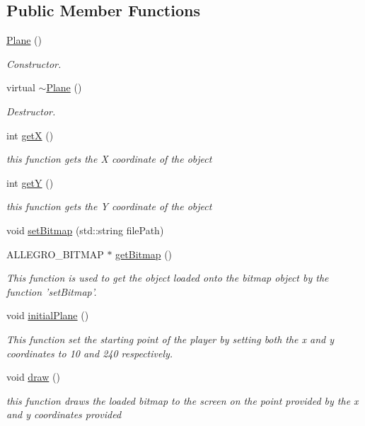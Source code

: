 \subsection*{Public Member Functions}
\begin{DoxyCompactItemize}
\item 
\hyperlink{classPlane_acac0d9c003e0ab10d07b146c3566a0c7}{Plane} ()
\begin{DoxyCompactList}\small\item\em Constructor. \item\end{DoxyCompactList}\item 
virtual \hyperlink{classPlane_a69abd86051c880dcb44b249ad10c4436}{$\sim$Plane} ()
\begin{DoxyCompactList}\small\item\em Destructor. \item\end{DoxyCompactList}\item 
int \hyperlink{classPlane_ab0db534796dff1c2ff490fe989261cda}{getX} ()
\begin{DoxyCompactList}\small\item\em this function gets the X coordinate of the object \item\end{DoxyCompactList}\item 
int \hyperlink{classPlane_a8c754851771ba75ecd163a55d2f31800}{getY} ()
\begin{DoxyCompactList}\small\item\em this function gets the Y coordinate of the object \item\end{DoxyCompactList}\item 
void \hyperlink{classPlane_a41fc70cf581d5f3d5efaba227d0b406b}{setBitmap} (std::string filePath)
\item 
ALLEGRO\_\-BITMAP $\ast$ \hyperlink{classPlane_a0d2bb766e1d07c7097fd741adff8c4d8}{getBitmap} ()
\begin{DoxyCompactList}\small\item\em This function is used to get the object loaded onto the bitmap object by the function 'setBitmap'. \item\end{DoxyCompactList}\item 
void \hyperlink{classPlane_a6f961e4c2c03b03bac2bd61749ec51e1}{initialPlane} ()
\begin{DoxyCompactList}\small\item\em This function set the starting point of the player by setting both the x and y coordinates to 10 and 240 respectively. \item\end{DoxyCompactList}\item 
void \hyperlink{classPlane_a8877358878e91929c4c01bad40cbdb78}{draw} ()
\begin{DoxyCompactList}\small\item\em this function draws the loaded bitmap to the screen on the point provided by the x and y coordinates provided \item\end{DoxyCompactList}\end{DoxyCompactItemize}
